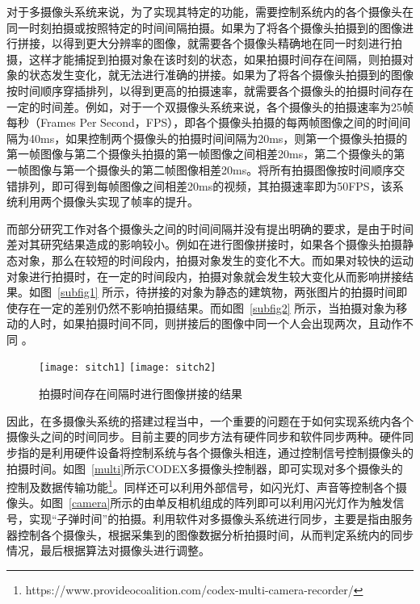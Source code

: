 对于多摄像头系统来说，为了实现其特定的功能，需要控制系统内的各个摄像头在同一时刻拍摄或按照特定的时间间隔拍摄。如果为了将各个摄像头拍摄到的图像进行拼接，以得到更大分辨率的图像，就需要各个摄像头精确地在同一时刻进行拍摄，这样才能捕捉到拍摄对象在该时刻的状态，如果拍摄时间存在间隔，则拍摄对象的状态发生变化，就无法进行准确的拼接。如果为了将各个摄像头拍摄到的图像按时间顺序穿插排列，以得到更高的拍摄速率，就需要各个摄像头的拍摄时间存在一定的时间差。例如，对于一个双摄像头系统来说，各个摄像头的拍摄速率为25帧每秒（Frames Per Second，FPS），即各个摄像头拍摄的每两帧图像之间的时间间隔为40ms，如果控制两个摄像头的拍摄时间间隔为20ms，则第一个摄像头拍摄的第一帧图像与第二个摄像头拍摄的第一帧图像之间相差20ms，第二个摄像头的第一帧图像与第一个摄像头的第二帧图像相差20ms。将所有拍摄图像按时间顺序交错排列，即可得到每帧图像之间相差20ms的视频，其拍摄速率即为50FPS，该系统利用两个摄像头实现了帧率的提升。

而部分研究工作对各个摄像头之间的时间间隔并没有提出明确的要求，是由于时间差对其研究结果造成的影响较小。例如在进行图像拼接时，如果各个摄像头拍摄静态对象，那么在较短的时间段内，拍摄对象发生的变化不大。而如果对较快的运动对象进行拍摄时，在一定的时间段内，拍摄对象就会发生较大变化从而影响拼接结果。如图~\ref{subfig1} 所示，待拼接的对象为静态的建筑物，两张图片的拍摄时间即使存在一定的差别仍然不影响拍摄结果。而如图~\ref{subfig2} 所示，当拍摄对象为移动的人时，如果拍摄时间不同，则拼接后的图像中同一个人会出现两次，且动作不同 \cite{2}。

\begin{figure}[h]
  \centering%
    {\texttt{[image: sitch1]}}
    \hspace{4em}%
      {\texttt{[image: sitch2]}}
  \caption{拍摄时间存在间隔时进行图像拼接的结果}
  \label{sitch}
\end{figure}

因此，在多摄像头系统的搭建过程当中，一个重要的问题在于如何实现系统内各个摄像头之间的时间同步。目前主要的同步方法有硬件同步和软件同步两种。硬件同步指的是利用硬件设备将控制系统与各个摄像头相连，通过控制信号控制摄像头的拍摄时间。如图~\ref{multi}所示CODEX多摄像头控制器，即可实现对多个摄像头的控制及数据传输功能\footnote{https://www.provideocoalition.com/codex-multi-camera-recorder/}。同样还可以利用外部信号，如闪光灯、声音等控制各个摄像头。如图~\ref{camera}所示的由单反相机组成的阵列即可以利用闪光灯作为触发信号，实现“子弹时间”的拍摄。利用软件对多摄像头系统进行同步，主要是指由服务器控制各个摄像头，根据采集到的图像数据分析拍摄时间，从而判定系统内的同步情况，最后根据算法对摄像头进行调整。

